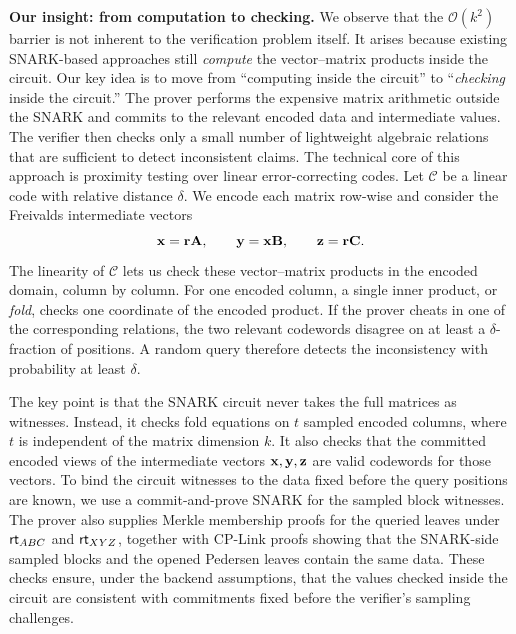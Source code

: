 \noindent\textbf{Our insight: from computation to checking.}
We observe that the \(\mathcal{O}(k^2)\) barrier is not inherent to the
verification problem itself.  It arises because existing SNARK-based approaches
still \emph{compute} the vector--matrix products inside the circuit.  Our key
idea is to move from ``computing inside the circuit'' to ``\emph{checking} inside the
circuit.''  The prover performs the expensive matrix arithmetic outside the
SNARK and commits to the relevant encoded data and intermediate values.  The
verifier then checks only a small number of lightweight algebraic relations
that are sufficient to detect inconsistent claims.
The technical core of this approach is proximity testing over linear
error-correcting codes.  Let \(\mathcal{C}\) be a linear code with relative
distance \(\delta\).  We encode each matrix row-wise and consider the Freivalds
intermediate vectors
\[
  \mathbf{x}=\mathbf{r}\mathbf{A},\qquad
  \mathbf{y}=\mathbf{x}\mathbf{B},\qquad
  \mathbf{z}=\mathbf{r}\mathbf{C}.
\]
The linearity of \(\mathcal{C}\) lets us check these vector--matrix products in
the encoded domain, column by column.  For one encoded column, a single inner
product, or \emph{fold}, checks one coordinate of the encoded product.  If the
prover cheats in one of the corresponding relations, the two relevant
codewords disagree on at least a \(\delta\)-fraction of positions.  A random
query therefore detects the inconsistency with probability at least \(\delta\).

The key point is that the SNARK circuit never takes the full matrices as witnesses.  Instead, it checks fold equations on \(t\) sampled encoded columns, where \(t\) is independent of the matrix dimension \(k\).  It also checks that the committed encoded views of the intermediate vectors \(\mathbf{x},\mathbf{y},\mathbf{z}\) are valid codewords for those vectors.  
To bind the circuit witnesses to the data fixed before the query positions are known,
we use a commit-and-prove SNARK for the sampled block witnesses.  The prover
also supplies Merkle membership proofs for the queried leaves under
\(\textsf{rt}_{ABC}\) and \(\textsf{rt}_{XYZ}\), together with CP-Link proofs showing that the
SNARK-side sampled blocks and the opened Pedersen leaves contain the same data.
These checks ensure, under the backend assumptions, that the values checked
inside the circuit are consistent with commitments fixed before the verifier's
sampling challenges.


